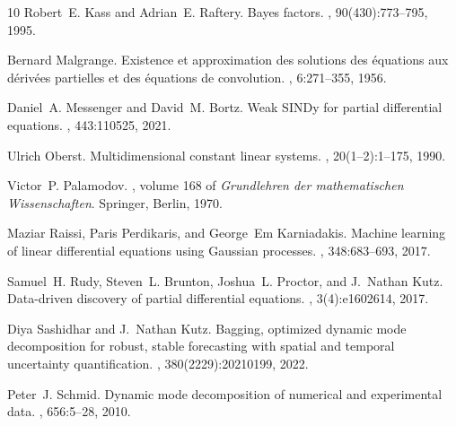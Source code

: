 \documentclass[11pt]{article}
\theoremstyle{plain}
\theoremstyle{definition}
\theoremstyle{remark}
\begin{document}
\begin{thebibliography}{10}
Robert~E. Kass and Adrian~E. Raftery.
\newblock Bayes factors.
,
  90(430):773--795, 1995.

Bernard Malgrange.
\newblock Existence et approximation des solutions des {\'e}quations aux
  d{\'e}riv{\'e}es partielles et des {\'e}quations de convolution.
, 6:271--355, 1956.

Daniel~A. Messenger and David~M. Bortz.
\newblock Weak {SINDy} for partial differential equations.
, 443:110525, 2021.

Ulrich Oberst.
\newblock Multidimensional constant linear systems.
, 20(1--2):1--175, 1990.

Victor~P. Palamodov.
,
  volume 168 of {\em Grundlehren der mathematischen Wissenschaften}.
\newblock Springer, Berlin, 1970.

Maziar Raissi, Paris Perdikaris, and George~Em Karniadakis.
\newblock Machine learning of linear differential equations using {G}aussian
  processes.
, 348:683--693, 2017.

Samuel~H. Rudy, Steven~L. Brunton, Joshua~L. Proctor, and J.~Nathan Kutz.
\newblock Data-driven discovery of partial differential equations.
, 3(4):e1602614, 2017.

Diya Sashidhar and J.~Nathan Kutz.
\newblock Bagging, optimized dynamic mode decomposition for robust, stable
  forecasting with spatial and temporal uncertainty quantification.
,
  380(2229):20210199, 2022.

Peter~J. Schmid.
\newblock Dynamic mode decomposition of numerical and experimental data.
, 656:5--28, 2010.

\end{thebibliography}
\end{document}
